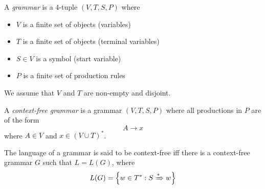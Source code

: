 \documentclass{imgs}
\begin{document}
\begin{definition}[Grammar]
  A \textit{grammar} is a 4-tuple $(V, T, S, P)$ where
  \begin{itemize}
    \item $V$ is a finite set of objects (variables)
    \item $T$ is a finite set of objects (terminal variables)
    \item $S \in V$ is a symbol (start variable)
    \item $P$ is a finite set of production rules
  \end{itemize}
  We assume that $V$ and $T$ are non-empty and disjoint.
\end{definition}

\begin{definition}
  A \textit{context-free grammar} is a grammar $(V, T, S, P)$ where
  all productions in $P$ are of the form
  \[
    A \to x
  \]
  where $A \in V$ and $x \in (V \cup T)^*$.
\end{definition}

\begin{definition}
  The language of a grammar is said to be context-free iff there is a context-free grammar $G$ such that $L = L(G)$, where
  \[
    L(G) = \left\{ w \in T^* : S \xRightarrow{*} w \right\}
  \]
\end{definition}
\end{document}
